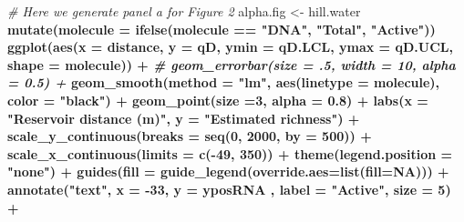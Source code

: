 \documentclass[]{article}
\newenvironment{Shaded}{\begin{snugshade}}{\end{snugshade}}
\newcommand{\CommentTok}[1]{\textcolor[rgb]{0.56,0.35,0.01}{\textit{#1}}}
\newcommand{\DataTypeTok}[1]{\textcolor[rgb]{0.13,0.29,0.53}{#1}}
\newcommand{\DecValTok}[1]{\textcolor[rgb]{0.00,0.00,0.81}{#1}}
\newcommand{\FloatTok}[1]{\textcolor[rgb]{0.00,0.00,0.81}{#1}}
\newcommand{\KeywordTok}[1]{\textcolor[rgb]{0.13,0.29,0.53}{\textbf{#1}}}
\newcommand{\NormalTok}[1]{#1}
\newcommand{\OperatorTok}[1]{\textcolor[rgb]{0.81,0.36,0.00}{\textbf{#1}}}
\newcommand{\OtherTok}[1]{\textcolor[rgb]{0.56,0.35,0.01}{#1}}
\newcommand{\StringTok}[1]{\textcolor[rgb]{0.31,0.60,0.02}{#1}}
\begin{document}
\begin{Shaded}
\begin{Highlighting}[]
\CommentTok{# Here we generate panel a for Figure 2}
\NormalTok{alpha.fig <-}\StringTok{ }\NormalTok{hill.water }\OperatorTok{%
\StringTok{  }\KeywordTok{mutate}\NormalTok{(}\DataTypeTok{molecule =} \KeywordTok{ifelse}\NormalTok{(molecule }\OperatorTok{==}\StringTok{ "DNA"}\NormalTok{, }\StringTok{"Total"}\NormalTok{, }\StringTok{"Active"}\NormalTok{)) }\OperatorTok{%
\StringTok{  }\KeywordTok{ggplot}\NormalTok{(}\KeywordTok{aes}\NormalTok{(}\DataTypeTok{x =}\NormalTok{ distance, }\DataTypeTok{y =}\NormalTok{ qD, }
             \DataTypeTok{ymin =}\NormalTok{ qD.LCL, }\DataTypeTok{ymax =}\NormalTok{ qD.UCL,}
             \DataTypeTok{shape =}\NormalTok{ molecule)) }\OperatorTok{+}\StringTok{ }
\StringTok{  }\CommentTok{# geom_errorbar(size = .5, width = 10, alpha = 0.5) +}
\StringTok{  }\KeywordTok{geom_smooth}\NormalTok{(}\DataTypeTok{method =} \StringTok{"lm"}\NormalTok{, }\KeywordTok{aes}\NormalTok{(}\DataTypeTok{linetype =}\NormalTok{ molecule), }\DataTypeTok{color =} \StringTok{"black"}\NormalTok{) }\OperatorTok{+}
\StringTok{  }\KeywordTok{geom_point}\NormalTok{(}\DataTypeTok{size =}\DecValTok{3}\NormalTok{, }\DataTypeTok{alpha =} \FloatTok{0.8}\NormalTok{) }\OperatorTok{+}\StringTok{ }
\StringTok{  }\KeywordTok{labs}\NormalTok{(}\DataTypeTok{x =} \StringTok{"Reservoir distance (m)"}\NormalTok{,}
       \DataTypeTok{y =} \StringTok{"Estimated richness"}\NormalTok{) }\OperatorTok{+}
\StringTok{  }\KeywordTok{scale_y_continuous}\NormalTok{(}\DataTypeTok{breaks =} \KeywordTok{seq}\NormalTok{(}\DecValTok{0}\NormalTok{, }\DecValTok{2000}\NormalTok{, }\DataTypeTok{by =} \DecValTok{500}\NormalTok{)) }\OperatorTok{+}
\StringTok{  }\KeywordTok{scale_x_continuous}\NormalTok{(}\DataTypeTok{limits =} \KeywordTok{c}\NormalTok{(}\OperatorTok{-}\DecValTok{49}\NormalTok{, }\DecValTok{350}\NormalTok{)) }\OperatorTok{+}
\StringTok{  }\KeywordTok{theme}\NormalTok{(}\DataTypeTok{legend.position =} \StringTok{"none"}\NormalTok{) }\OperatorTok{+}
\StringTok{  }\KeywordTok{guides}\NormalTok{(}\DataTypeTok{fill =} \KeywordTok{guide_legend}\NormalTok{(}\DataTypeTok{override.aes=}\KeywordTok{list}\NormalTok{(}\DataTypeTok{fill=}\OtherTok{NA}\NormalTok{))) }\OperatorTok{+}
\StringTok{  }\KeywordTok{annotate}\NormalTok{(}\StringTok{"text"}\NormalTok{, }\DataTypeTok{x =} \DecValTok{-33}\NormalTok{, }\DataTypeTok{y =}\NormalTok{ yposRNA , }
           \DataTypeTok{label =} \StringTok{"Active"}\NormalTok{, }\DataTypeTok{size =} \DecValTok{5}\NormalTok{) }\OperatorTok{+}
}}
\end{Highlighting}
\end{Shaded}
\end{document}
